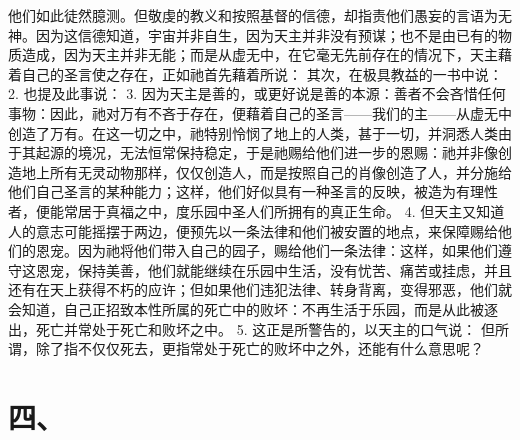 他们如此徒然臆测。但敬虔的教义和按照基督的信德，却指责他们愚妄的言语为无神。因为这信德知道，宇宙并非自生，因为天主并非没有预谋；也不是由已有的物质造成，因为天主并非无能；而是从虚无中，在它毫无先前存在的情况下，天主藉着自己的圣言使之存在，正如祂首先藉着所说： 其次，在极具教益的一书中说： 2. 也提及此事说： 3. 因为天主是善的，或更好说是善的本源：善者不会吝惜任何事物：因此，祂对万有不吝于存在，便藉着自己的圣言——我们的主——从虚无中创造了万有。在这一切之中，祂特别怜悯了地上的人类，甚于一切，并洞悉人类由于其起源的境况，无法恒常保持稳定，于是祂赐给他们进一步的恩赐：祂并非像创造地上所有无灵动物那样，仅仅创造人，而是按照自己的肖像创造了人，并分施给他们自己圣言的某种能力；这样，他们好似具有一种圣言的反映，被造为有理性者，便能常居于真福之中，度乐园中圣人们所拥有的真正生命。 4. 但天主又知道人的意志可能摇摆于两边，便预先以一条法律和他们被安置的地点，来保障赐给他们的恩宠。因为祂将他们带入自己的园子，赐给他们一条法律：这样，如果他们遵守这恩宠，保持美善，他们就能继续在乐园中生活，没有忧苦、痛苦或挂虑，并且还有在天上获得不朽的应许；但如果他们违犯法律、转身背离，变得邪恶，他们就会知道，自己正招致本性所属的死亡中的败坏：不再生活于乐园，而是从此被逐出，死亡并常处于死亡和败坏之中。 5. 这正是所警告的，以天主的口气说： 但所谓，除了指不仅仅死去，更指常处于死亡的败坏中之外，还能有什么意思呢？\par


\section{四、}

